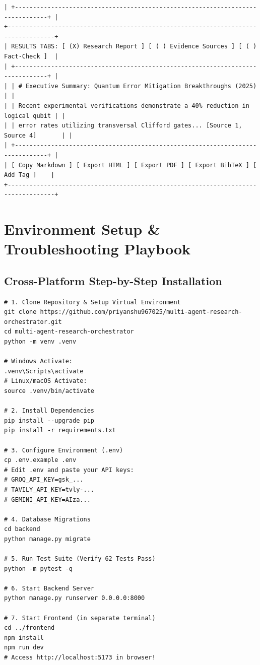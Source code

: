 \documentclass[11pt,a4paper,twoside]{report}
\begin{document}
\begin{lstlisting}[language={},caption={ASCII Dashboard Layout}]
| +-------------------------------------------------------------------------------+ |
+-----------------------------------------------------------------------------------+
| RESULTS TABS: [ (X) Research Report ] [ ( ) Evidence Sources ] [ ( ) Fact-Check ]  |
| +-------------------------------------------------------------------------------+ |
| | # Executive Summary: Quantum Error Mitigation Breakthroughs (2025)            | |
| | Recent experimental verifications demonstrate a 40% reduction in logical qubit | |
| | error rates utilizing transversal Clifford gates... [Source 1, Source 4]       | |
| +-------------------------------------------------------------------------------+ |
| [ Copy Markdown ] [ Export HTML ] [ Export PDF ] [ Export BibTeX ] [ Add Tag ]    |
+-----------------------------------------------------------------------------------+
\end{lstlisting}



\chapter{Environment Setup \& Troubleshooting Playbook}

\section{Cross-Platform Step-by-Step Installation}

\begin{lstlisting}[language={},caption={Quick-Start Commands}]
# 1. Clone Repository & Setup Virtual Environment
git clone https://github.com/priyanshu967025/multi-agent-research-orchestrator.git
cd multi-agent-research-orchestrator
python -m venv .venv

# Windows Activate:
.venv\Scripts\activate
# Linux/macOS Activate:
source .venv/bin/activate

# 2. Install Dependencies
pip install --upgrade pip
pip install -r requirements.txt

# 3. Configure Environment (.env)
cp .env.example .env
# Edit .env and paste your API keys:
# GROQ_API_KEY=gsk_...
# TAVILY_API_KEY=tvly-...
# GEMINI_API_KEY=AIza...

# 4. Database Migrations
cd backend
python manage.py migrate

# 5. Run Test Suite (Verify 62 Tests Pass)
python -m pytest -q

# 6. Start Backend Server
python manage.py runserver 0.0.0.0:8000

# 7. Start Frontend (in separate terminal)
cd ../frontend
npm install
npm run dev
# Access http://localhost:5173 in browser!
\end{lstlisting}
\end{document}
